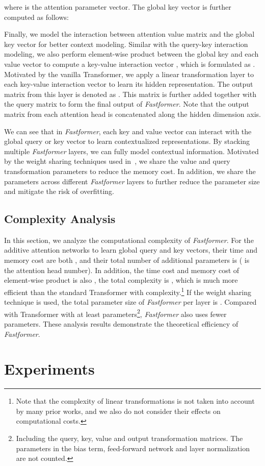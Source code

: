 \documentclass[11pt,a4paper]{article}
\begin{document}
where  is the attention parameter vector.
The global key vector  is further computed as follows:



Finally, we model the interaction between attention value matrix and the global key vector for better context modeling.
Similar with the query-key interaction modeling, we also perform element-wise product between the global key and each value vector to compute a key-value interaction vector , which is formulated as .
Motivated by the vanilla Transformer, we apply a linear transformation layer to each key-value interaction vector to learn its hidden representation.
The output matrix from this layer is denoted as .
This matrix is further added together with the query matrix to form the final output of \textit{Fastformer}.
Note that the output matrix from each attention head is concatenated along the hidden dimension axis.



We can see that in \textit{Fastformer}, each key and value vector can interact with the global query or key vector to learn contextualized representations.
By stacking multiple \textit{Fastformer} layers, we can fully model contextual information.
Motivated by the weight sharing techniques used in~\cite{wang2020linformer}, we share the value and query transformation parameters to reduce the memory cost.
In addition, we share the parameters across different  \textit{Fastformer} layers to further reduce the parameter size and mitigate the risk of overfitting.



\subsection{Complexity Analysis}

In this section, we analyze the computational complexity of \textit{Fastformer}.
For the additive attention networks to learn global query and key vectors, their time and memory cost are both , and their total number of additional parameters is  ( is the attention head number).
In addition, the time cost and memory cost of element-wise product is also , the total complexity is , which is much more efficient than the standard Transformer with  complexity.\footnote{Note that the complexity of linear transformations is not taken into account by many prior works, and we also do not consider their effects on computational costs.}
If the weight sharing technique is used, the total parameter size of \textit{Fastformer} per layer is .
Compared with Transformer with at least  parameters\footnote{Including the query, key, value and output transformation matrices. The parameters in the bias term, feed-forward network and layer normalization are not counted.}, \textit{Fastformer} also uses fewer parameters.
These analysis results demonstrate the theoretical efficiency of \textit{Fastformer}. \section{Experiments}\label{sec:Experiments}
\end{document}
